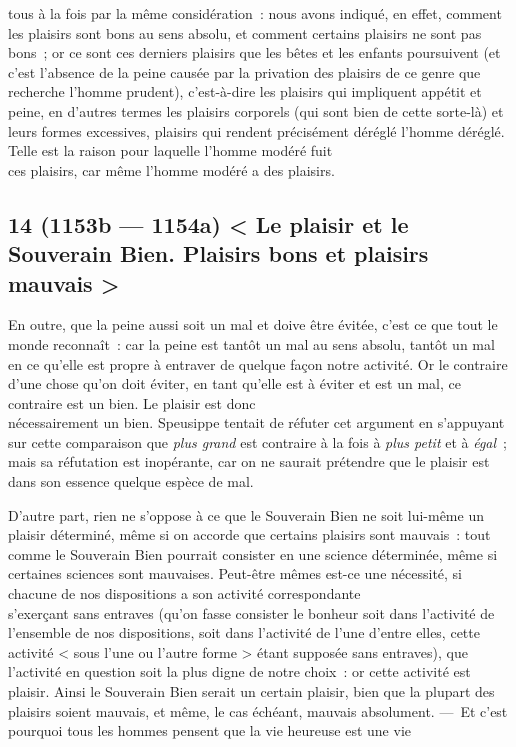 \documentclass[french,twoside]{book} %
\begin{document}
tous à la fois par la même considération : nous avons indiqué, en effet, comment les plaisirs sont bons au sens absolu, et comment certains plaisirs ne sont pas bons ; or ce sont ces derniers plaisirs que les bêtes et les enfants poursuivent (et c’est l’absence de la peine causée par la privation des plaisirs de ce genre que recherche l’homme prudent), c’est-à-dire les plaisirs qui impliquent appétit et peine, en d’autres termes les plaisirs corporels (qui sont bien de cette sorte-là) et leurs formes excessives, plaisirs qui rendent précisément déréglé l’homme déréglé. Telle est la raison pour laquelle l’homme modéré fuit \\
ces plaisirs, car même l’homme modéré a des plaisirs.
\subsection[{14 (1153b — 1154a) < Le plaisir et le Souverain Bien. Plaisirs bons et plaisirs mauvais >}]{14 (1153b — 1154a) < Le plaisir et le Souverain Bien. Plaisirs bons et plaisirs mauvais >}
\noindent  En outre, que la peine aussi soit un mal et doive être évitée, c’est ce que tout le monde reconnaît : car la peine est tantôt un mal au sens absolu, tantôt un mal en ce qu’elle est propre à entraver de quelque façon notre activité. Or le contraire d’une chose qu’on doit éviter, en tant qu’elle est à éviter et est un mal, ce contraire est un bien. Le plaisir est donc \\
nécessairement un bien. Speusippe tentait de réfuter cet argument en s’appuyant sur cette comparaison que {\itshape plus grand} est contraire à la fois à {\itshape plus petit} et à {\itshape égal} ; mais sa réfutation est inopérante, car on ne saurait prétendre que le plaisir est dans son essence quelque espèce de mal.\par
D’autre part, rien ne s’oppose à ce que le Souverain Bien ne soit lui-même un plaisir déterminé, même si on accorde que certains plaisirs sont mauvais : tout comme le Souverain Bien pourrait consister en une science déterminée, même si certaines sciences sont mauvaises. Peut-être mêmes est-ce une nécessité, si chacune de nos dispositions a son activité correspondante \\
s’exerçant sans entraves (qu’on fasse consister le bonheur soit dans l’activité de l’ensemble de nos dispositions, soit dans l’activité de l’une d’entre elles, cette activité < sous l’une ou l’autre forme > étant supposée sans entraves), que l’activité en question soit la plus digne de notre choix : or cette activité est plaisir. Ainsi le Souverain Bien serait un certain plaisir, bien que la plupart des plaisirs soient mauvais, et même, le cas échéant, mauvais absolument. — Et c’est pourquoi tous les hommes pensent que la vie heureuse est une vie \\
\end{document}
